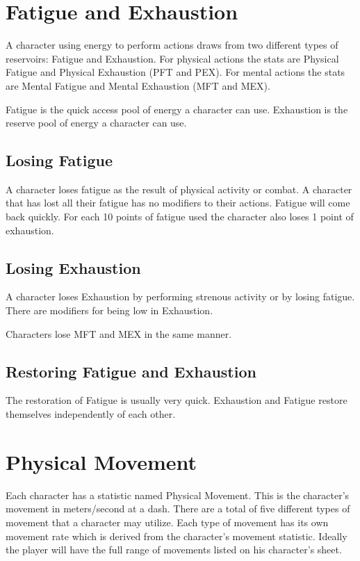 

\section{Fatigue and Exhaustion}

A character using energy to perform actions draws from two different 
types of reservoirs: Fatigue and Exhaustion. For physical actions the 
stats are Physical Fatigue and Physical Exhaustion (PFT and PEX). For mental
actions the stats are Mental Fatigue and Mental Exhaustion (MFT and MEX).

Fatigue is the quick access pool of energy a character can use.
Exhaustion is the reserve pool of energy a character can use. 

\subsection{Losing Fatigue}

A character loses fatigue as the result of physical activity or combat. 
A character that has lost all their fatigue has no modifiers to their actions.
Fatigue will come back quickly. For each 10 points of fatigue used the character 
also loses 1 point of exhaustion.

\subsection{Losing Exhaustion}
A character loses Exhaustion by performing strenous activity or by losing 
fatigue. There are modifiers for being low in Exhaustion.



Characters lose MFT and MEX in the same manner.



\subsection{Restoring Fatigue and Exhaustion}

The restoration of Fatigue is usually very quick. Exhaustion and Fatigue
restore themselves independently of each other.



\section{Physical Movement}

Each character has a statistic named Physical Movement. This is the character's
movement in meters/second at a dash. There are a total of five different types
of movement that a character may utilize. Each type of movement has its own
movement rate which is derived from the character's movement statistic. 
Ideally the player will have the full range of movements listed on his 
character's sheet. 

